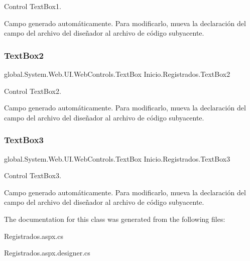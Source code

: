 Control Text\+Box1. 

Campo generado automáticamente. Para modificarlo, mueva la declaración del campo del archivo del diseñador al archivo de código subyacente. \mbox{\label{class_inicio_1_1_registrados_a14706b4c2eeec2fe1d93f7d0ae00993c}} 
\subsubsection{\texorpdfstring{TextBox2}{TextBox2}}
{\footnotesize\ttfamily global.\+System.\+Web.\+U\+I.\+Web\+Controls.\+Text\+Box Inicio.\+Registrados.\+Text\+Box2\hspace{0.3cm}{\ttfamily [protected]}}



Control Text\+Box2. 

Campo generado automáticamente. Para modificarlo, mueva la declaración del campo del archivo del diseñador al archivo de código subyacente. \mbox{\label{class_inicio_1_1_registrados_a42dd2c03767d9a49a113c1c4e864d790}} 
\subsubsection{\texorpdfstring{TextBox3}{TextBox3}}
{\footnotesize\ttfamily global.\+System.\+Web.\+U\+I.\+Web\+Controls.\+Text\+Box Inicio.\+Registrados.\+Text\+Box3\hspace{0.3cm}{\ttfamily [protected]}}



Control Text\+Box3. 

Campo generado automáticamente. Para modificarlo, mueva la declaración del campo del archivo del diseñador al archivo de código subyacente. 

The documentation for this class was generated from the following files\+:\begin{DoxyCompactItemize}
\item 
Registrados.\+aspx.\+cs\item 
Registrados.\+aspx.\+designer.\+cs\end{DoxyCompactItemize}
